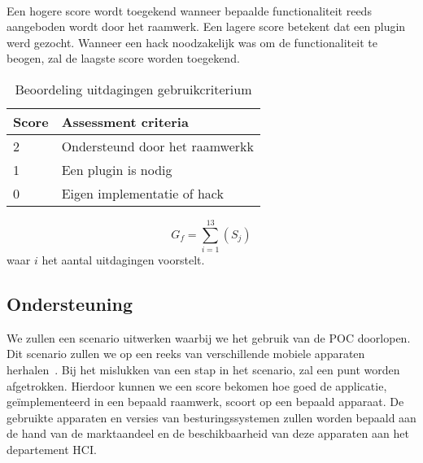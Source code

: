 \paragraph{}
Een hogere score wordt toegekend wanneer bepaalde functionaliteit reeds aangeboden wordt door het raamwerk. 
Een lagere score betekent dat een plugin werd gezocht. 
Wanneer een hack noodzakelijk was om de functionaliteit te beogen, zal de laagste score worden toegekend.
\begin{table}[h]	
  \centering
  \begin{tabular}{ll}
    \toprule
    \textbf{Score} & \textbf{Assessment criteria}\\
    \midrule
    2 & Ondersteund door het raamwerkk\\
    1 & Een plugin is nodig\\
    0 & Eigen implementatie of hack\\
    \bottomrule
  \end{tabular}
  \caption{Beoordeling uitdagingen gebruikcriterium}
  \label{tabel:scores-uitdagingen}
\end{table}
\begin{equation}
  G_f = \sum_{i=1}^{13}{\left(S_j\right)}
  \label{eq:gebruik}
\end{equation}
waar $i$ het aantal uitdagingen voorstelt.

\subsection{Ondersteuning}
\label{sec:vergelijking-gemeenschap}
We zullen een scenario uitwerken waarbij we het gebruik van de POC doorlopen. 
Dit scenario zullen we op een reeks van verschillende mobiele apparaten herhalen~\cite{Sarrafi2012a}. 
Bij het mislukken van een stap in het scenario, zal een punt worden afgetrokken. 
Hierdoor kunnen we een score bekomen hoe goed de applicatie, geïmplementeerd in een bepaald raamwerk, scoort op een bepaald apparaat. 
De gebruikte apparaten en versies van besturingssystemen zullen worden bepaald aan de hand van de marktaandeel en de beschikbaarheid van deze apparaten aan het departement HCI.

